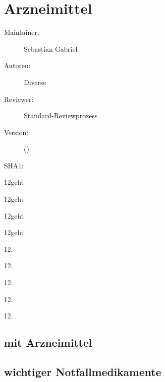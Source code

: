 \def\ChapterCode{ARZ}
\chapter
[Arzneimittel]
{Arzneimittel}
\label{chp:ARZ}




\ChapterIntro
{%

}
{%
\begin{description}
  \item[Maintainer:] Sebastian Gabriel
  \item[Autoren:] Diverse
  \item[Reviewer:] Standard-Reviewprozess
  \item[Version:] {\VarDocVersionTypeName} 
  ({\VarDocVersionTypeDescription})
  \item[SHA1:] {\DocGitCommit}
\end{description}

{\TxTeilkapitelAASS}
}


12\Mg* geht

12\Mg geht

12\MgDl* geht

12\MgDl geht

12\Mg*.

12\Mg.

12\MgDl*.

12\MgDl.

12\MgKg*.



\section{ mit Arzneimittel}



\section{ wichtiger 
Notfallmedikamente}


\section{}


